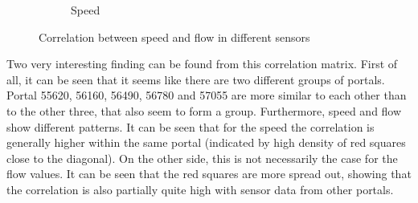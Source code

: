 \begin{figure}[H]
\begin{subfigure}{0.9 \linewidth}
			\caption{Speed}
		\end{subfigure}
		\caption{Correlation between speed and flow in different sensors}
		\label{fig:sensor_corr_by_portal}
	\end{figure}
	\noindent Two very interesting finding can be found from this correlation matrix. First of all, it can be seen that it seems like there are two different groups of portals. Portal 55620, 56160, 56490, 56780 and 57055 are more similar to each other than to the other three, that also seem to form a group. 
	Furthermore, speed and flow show different patterns. It can be seen that for the speed the correlation is generally higher within the same portal (indicated by high density of red squares close to the diagonal). On the other side, this is not necessarily the case for the flow values. It can be seen that the red squares are more spread out, showing that the correlation is also partially quite high with sensor data from other portals.
